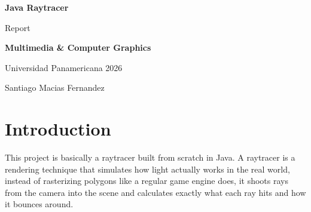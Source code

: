 \documentclass[
]{article}
\author{}
\date{}
\begin{document}
\textbf{Java Raytracer}

Report

\textbf{Multimedia \& Computer Graphics}

Universidad Panamericana \textbar{} 2026

Santiago Macias Fernandez

\section{}\label{section}

\section{}\label{section-1}

\section{}\label{section-2}

\section{}\label{section-3}

\section{}\label{section-4}

\section{}\label{section-5}

\section{}\label{section-6}

\section{}\label{section-7}

\section{\texorpdfstring{\textbf{Introduction}}{Introduction}}\label{introduction}

This project is basically a raytracer built from scratch in Java. A
raytracer is a rendering technique that simulates how light actually
works in the real world, instead of rasterizing polygons like a regular
game engine does, it shoots rays from the camera into the scene and
calculates exactly what each ray hits and how it bounces around.
\end{document}
